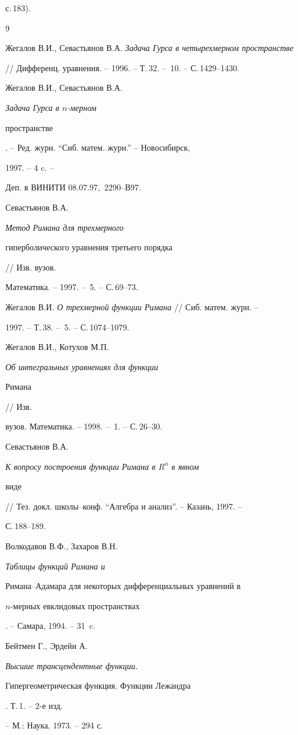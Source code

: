 с.\,183).





\begin{thebibliography}{9}







Жегалов В.И., Севастьянов В.А. {\em Задача Гурса в четырехмерном пространстве}


// Дифференц. уравнения. -- 1996. -- Т.\,32. -- \No\,10. -- С.\,1429--1430.




Жегалов В.И., Севастьянов В.А. {\em Задача Гурса в  $n$-мерном


пространстве}. -- Ред. журн. ``Сиб. матем. журн.'' -- Новосибирск,


1997. -- 4 c. --


Деп. в ВИНИТИ 08.07.97, \No\,2290--В97.




Севастьянов В.А. {\em Метод Римана для трехмерного


гиперболического уравнения третьего порядка} // Изв. вузов.


Математика. -- 1997. --  \No\,5. -- С.\,69--73.




Жегалов В.И. {\em О трехмерной функции Римана} // Сиб. матем. журн. --


1997. -- Т.\,38. -- \No\,5. -- С.\,1074--1079.




Жегалов В.И., Котухов М.П. {\em Об интегральных уравнениях для функции


Римана} // Изв.


вузов. Математика. -- 1998. -- \No\,1. -- С.\,26--30.




Севастьянов В.А. {\em К вопросу построения функции Римана в $R^{n}$ в явном


виде} // Тез. докл. школы--конф. ``Алгебра и анализ''. -- Казань, 1997. --


С.\,188--189.




Волкодавов В.Ф., Захаров В.Н. {\em Таблицы функций Римана и


Римана--Адамара для некоторых дифференциальных уравнений в


$n$-мерных евклидовых пространствах}. -- Самара, 1994. -- 31~c.




Бейтмен Г., Эрдейи А. {\em Высшие трансцендентные функции.


Гипергеометрическая функция. Функции Лежандра}. Т.\,1. -- 2-е изд.


-- М.: Наука, 1973. -- 294 с.





\end{thebibliography}





